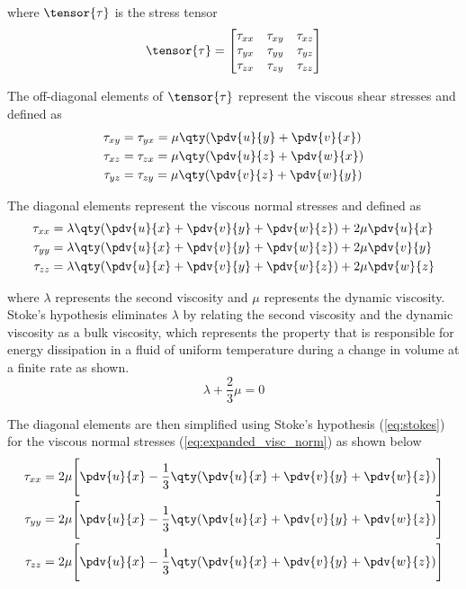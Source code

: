 \noindent
where $\tensor{\tau}$  is the stress tensor
%
\begin{equation}
  \tensor{\tau} =
  \begin{bmatrix}
    \tau_{xx} & \tau_{xy} & \tau_{xz} \\
    \tau_{yx} & \tau_{yy} & \tau_{yz} \\
    \tau_{zx} & \tau_{zy} & \tau_{zz}
  \end{bmatrix} \label{eq:stress_tensor}
\end{equation} 

The off-diagonal elements of $\tensor{\tau}$ represent the viscous shear stresses and defined as
%
\begin{align} \begin{split}
  \tau_{xy} &= \tau_{yx} = \mu\qty(\pdv{u}{y} + \pdv{v}{x}) \\
  \tau_{xz} &= \tau_{zx} = \mu\qty(\pdv{u}{z} + \pdv{w}{x}) \\
  \tau_{yz} &= \tau_{zy} = \mu\qty(\pdv{v}{z} + \pdv{w}{y})
\end{split} \label{eq:visc_shear_stresses} \end{align}

The diagonal elements represent the viscous normal stresses and defined as
%
\begin{align} \begin{split}
  \tau_{xx} &= \lambda\qty(\pdv{u}{x}+\pdv{v}{y}+\pdv{w}{z}) + 2\mu\pdv{u}{x} \\
  \tau_{yy} &= \lambda\qty(\pdv{u}{x}+\pdv{v}{y}+\pdv{w}{z}) + 2\mu\pdv{v}{y} \\
  \tau_{zz} &= \lambda\qty(\pdv{u}{x}+\pdv{v}{y}+\pdv{w}{z}) + 2\mu\pdv{w}{z} 
\end{split} \label{eq:expanded_visc_norm}\end{align}

\noindent
where $\lambda$ represents the second viscosity and $\mu$ represents the dynamic viscosity. Stoke's hypothesis eliminates $\lambda$ by relating the second viscosity and the dynamic viscosity as a bulk viscosity, which represents the property that is responsible for energy dissipation in a fluid of uniform temperature during a change in volume at a finite rate as shown.
%
\begin{equation} \lambda + \frac{2}{3}\mu = 0 \label{eq:stokes} \end{equation}

\noindent
The diagonal elements are then simplified using Stoke's hypothesis (\cref{eq:stokes}) for the viscous normal stresses (\cref{eq:expanded_visc_norm}) as shown below
%
\begin{align} \begin{split}
  \tau_{xx} &= 2\mu\Bigg[\pdv{u}{x} - \frac{1}{3}\qty(\pdv{u}{x}+\pdv{v}{y}+\pdv{w}{z})\Bigg] \\
  \tau_{yy} &= 2\mu\Bigg[\pdv{u}{x} - \frac{1}{3}\qty(\pdv{u}{x}+\pdv{v}{y}+\pdv{w}{z})\Bigg] \\
  \tau_{zz} &= 2\mu\Bigg[\pdv{u}{x} - \frac{1}{3}\qty(\pdv{u}{x}+\pdv{v}{y}+\pdv{w}{z})\Bigg]
\end{split} \label{eq:visc_norm_stresses} \end{align}

